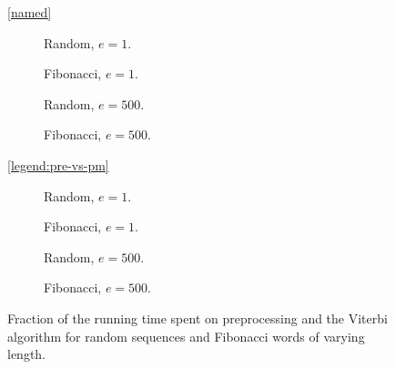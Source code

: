 \begin{figure}
  \centering\ref{named}\\
  \begin{subfigure}[b]{0.24\textwidth}
    \centering 
    \captionsetup{margin=12pt}
    \caption{Random, $e = 1$.}
  \end{subfigure}\hfill%
  \begin{subfigure}[b]{0.24\textwidth}
    \centering 
    \captionsetup{margin=12pt}
    \caption{Fibonacci, $e = 1$.}
  \end{subfigure}\hfill%
  \begin{subfigure}[b]{0.24\textwidth}
    \centering 
    \captionsetup{margin=12pt}
    \caption{Random, $ e = 500$.}
  \end{subfigure}\hfill%
  \begin{subfigure}[b]{0.24\textwidth}
    \centering 
    \captionsetup{margin=12pt}
    \caption{Fibonacci, $ e = 500$.}
  \end{subfigure}

\ref{legend:pre-vs-pm}\\
  \begin{subfigure}[b]{0.24\textwidth}
    \centering 
    \captionsetup{margin=12pt}
    \caption{Random, $e = 1$.}
  \end{subfigure}\hfill%
  \begin{subfigure}[b]{0.24\textwidth}
    \centering 
    \captionsetup{margin=12pt}
    \caption{Fibonacci, $e = 1$.}
  \end{subfigure}\hfill%
  \begin{subfigure}[b]{0.24\textwidth}
    \centering 
    \captionsetup{margin=12pt}
    \caption{Random, $ e = 500$.}
  \end{subfigure}\hfill%
  \begin{subfigure}[b]{0.24\textwidth}
    \centering 
    \captionsetup{margin=12pt}
    \caption{Fibonacci, $ e = 500$.}
  \end{subfigure}
  \caption{Fraction of the running time spent on preprocessing and the
    Viterbi algorithm for random sequences and Fibonacci words of varying length.}
  \label{fig:pre_vs_running}
\end{figure}

